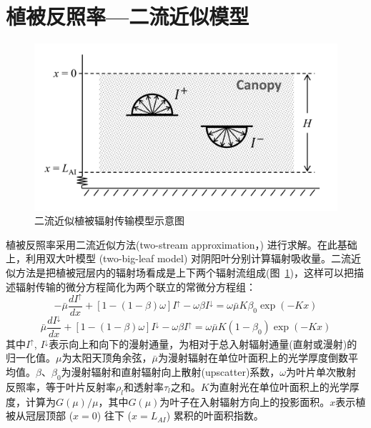 \section{植被反照率---二流近似模型}\label{植被反照率二流近似模型}
{
\begin{figure}[htbp]
\centering
\includegraphics[width=0.7\columnwidth]{Figures/辐射过程及辐射通量计算/二流近似模型示意图.png}
\caption{二流近似植被辐射传输模型示意图}
\label{fig:二流近似模型示意图}
\end{figure}
}
植被反照率采用二流近似方法(two-stream approximation，\citet{dickinson1983land,sellers1985canopy}) 进行求解。在此基础上，利用双大叶模型 (two-big-leaf model) \citep{dai2004two} 对阴阳叶分别计算辐射吸收量。二流近似方法是把植被冠层内的辐射场看成是上下两个辐射流组成(图~\ref{fig:二流近似模型示意图})，这样可以把描述辐射传输的微分方程简化为两个联立的常微分方程组：
\begin{equation}\label{di_dx1}
-\bar{\mu} \frac{d I^{\uparrow}}{d x}+\left[1-(1-\beta) \omega\right] I^{\uparrow}-\omega \beta I^{\downarrow}=\omega \bar{\mu} K \beta_{0} \exp (-K x)
\end{equation}
\begin{equation}\label{di_dx2}
\bar{\mu} \frac{d I^{\downarrow}}{d x}+\left[1-(1-\beta) \omega\right] I^{\downarrow}-\omega \beta I^{\uparrow}=\omega \bar{\mu} K\left(1-\beta_{0}\right) \exp (-K x)
\end{equation}
其中$I^{\uparrow}$, $I^{\downarrow}$表示向上和向下的漫射通量，为相对于总入射辐射通量(直射或漫射)的归一化值。$\mu$为太阳天顶角余弦，$\bar{\mu}$为漫射辐射在单位叶面积上的光学厚度倒数平均值。$\beta$、$\beta_{0}$为漫射辐射和直射辐射向上散射(upscatter)系数，$\omega$为叶片单次散射反照率，等于叶片反射率$\rho_{l}$和透射率$\tau_{l}$之和。$K$为直射光在单位叶面积上的光学厚度，计算为$G(\mu) / \mu$，其中$G(\mu)$为叶子在入射辐射方向上的投影面积。$x$表示植被从冠层顶部 ($x=0$) 往下 ($x=L_{AI}$) 累积的叶面积指数。

